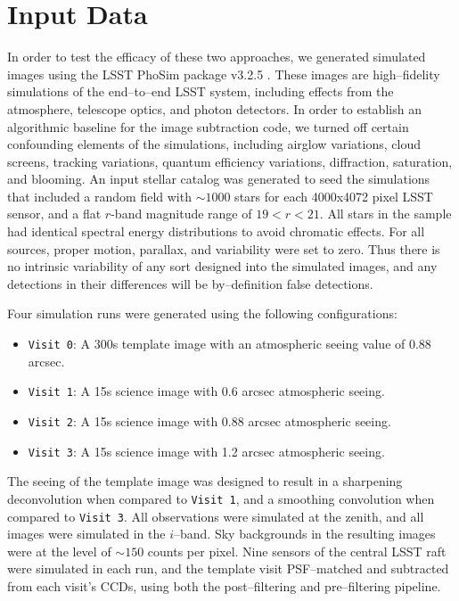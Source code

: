 \documentclass[iop]{emulateapj}
\begin{document}

\section{Input Data}

In order to test the efficacy of these two approaches, we generated simulated images using the LSST PhoSim package v3.2.5 \citep{phosim}.
These images are high--fidelity simulations of the end--to--end LSST system, including effects from the atmosphere, telescope optics, and photon detectors.
In order to establish an algorithmic baseline for the image subtraction code, we turned off certain confounding elements of the simulations, including airglow variations, cloud screens, tracking variations, quantum efficiency variations, diffraction, saturation, and blooming.
An input stellar catalog was generated to seed the simulations that included a random field with $\sim 1000$ stars for each 4000x4072 pixel LSST sensor, and a flat $r$-band magnitude range of $19<r<21$.
All stars in the sample had identical spectral energy distributions to avoid chromatic effects.
For all sources, proper motion, parallax, and variability were set to zero.
Thus there is no intrinsic variability of any sort designed into the simulated images, and any detections in their differences will be by--definition false detections.

Four simulation runs were generated using the following configurations:
\begin{itemize}
\item {\tt Visit 0}: A 300s template image with an atmospheric seeing value of 0.88 arcsec.
\item {\tt Visit 1}: A 15s science image with 0.6 arcsec atmospheric seeing.
\item {\tt Visit 2}: A 15s science image with 0.88 arcsec atmospheric seeing.
\item {\tt Visit 3}: A 15s science image with 1.2 arcsec atmospheric seeing.
\end{itemize}
The seeing of the template image was designed to result in a sharpening deconvolution when compared to {\tt Visit 1}, and a smoothing convolution when compared to {\tt Visit 3}.
All observations were simulated at the zenith, and all images were simulated in the $i$--band.
Sky backgrounds in the resulting images were at the level of $\sim 150$ counts per pixel.
Nine sensors of the central LSST raft were simulated in each run, and the template visit PSF--matched and subtracted from each visit's CCDs, using both the post--filtering and pre--filtering pipeline.
\end{document}
